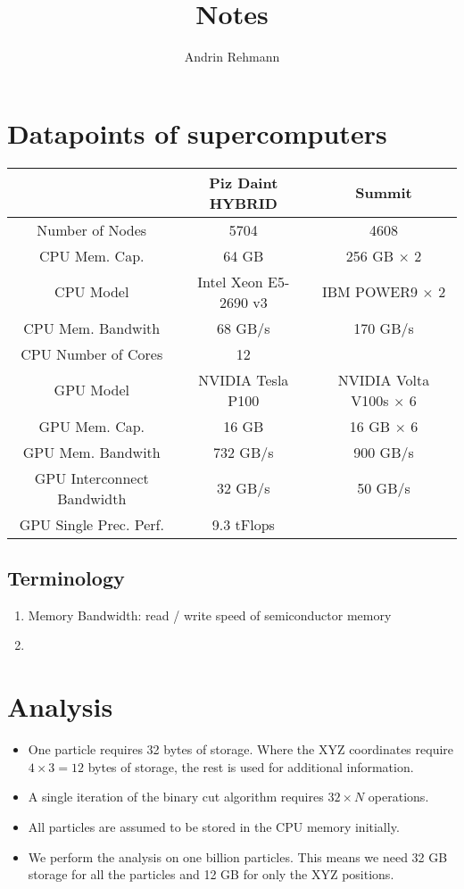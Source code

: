 \documentclass[]{article}
\title{Notes}
\author{Andrin Rehmann}
\begin{document}
\maketitle

\section{Datapoints of supercomputers}

\begin{center}
	\begin{tabular}{ c c c }
		& Piz Daint HYBRID \cite{piz_daint} & Summit \\ 
		\hline
		Number of Nodes & 5704 & 4608\\
		CPU Mem. Cap. & 64 GB & 256 GB $\times$ 2  \\   
		CPU Model & Intel Xeon E5-2690 v3 & IBM POWER9 $\times$ 2 \\
		CPU Mem. Bandwith  & 68 GB/s & 170 GB/s\\
		CPU Number of Cores & 12 \\
		GPU Model & NVIDIA Tesla P100 & NVIDIA Volta V100s $\times$ 6 \\
		GPU Mem. Cap. & 16 GB & 16 GB $\times$ 6\\
		GPU Mem. Bandwith & 732 GB/s & 900 GB/s \\
		GPU Interconnect Bandwidth & 32 GB/s & 50 GB/s \\
		GPU Single Prec. Perf. & 9.3 tFlops
	\end{tabular}
\end{center}

\subsection{Terminology}

\begin{enumerate}
	\item Memory Bandwidth: read / write speed of semiconductor memory
	\item 

\end{enumerate}

\section{Analysis}

\begin{itemize}
	\item 
	One particle requires 32 bytes of storage. Where the XYZ coordinates require $4\times3 = 12$ bytes of storage, the rest is used for additional information.
	
	\item
	A single iteration of the binary cut algorithm requires $32 \times N$ operations.
	
	\item 
	All particles are assumed to be stored in the CPU memory initially.
	
	\item
	We perform the analysis on one billion particles. This means we need 32 GB storage for all the particles and 12 GB for only the XYZ positions.
\end{itemize}
\end{document}
